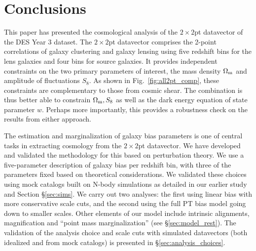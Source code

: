 \documentclass[fleqn,usenatbib]{mnras}
\begin{document}


\section{Conclusions}

This paper has presented the cosmological analysis of the $2\times2$pt datavector of the DES Year 3 dataset. The $2\times2$pt datavector comprises the 2-point correlations of galaxy clustering and galaxy lensing using five redshift bins for the lens galaxies and four bins for source galaxies. It provides independent constraints on the two primary parameters of interest, the mass density $\Omega_{\rm m}$ and amplitude of fluctuations $S_8$. As shown in Fig.~\ref{fig:all2pt_comp}, these constraints are complementary to those from cosmic shear. The combination is thus better able to constrain $\Omega_{\rm m}, S_8$ as well as the dark energy equation of state parameter $w$. Perhaps more importantly, this provides a robustness check on the results from either approach. 

The estimation and marginalization of galaxy bias parameters is one of central tasks in extracting cosmology from the $2\times2$pt datavector. We have developed and validated the methodology for this based on perturbation theory. We use a five-parameter description of galaxy bias per redshift bin, with three of the parameters fixed based on theoretical considerations. We validated these choices using mock catalogs built on N-body simulations as detailed in our earlier study \citep{p2020perturbation} and Section \S\ref{sec:sims}.  
We carry out two analyses: the first using linear bias with more conservative scale cuts, and the second using the full PT bias model going down to smaller scales. Other  elements of our model include intrinsic alignments, magnification and ``point mass marginalization'' (see \S\ref{sec:model_rest}). The validation of the analysis choice and scale cuts with simulated datavectors (both idealized and from mock catalogs) is presented in \S\ref{sec:analysis_choices}. 
\end{document}
